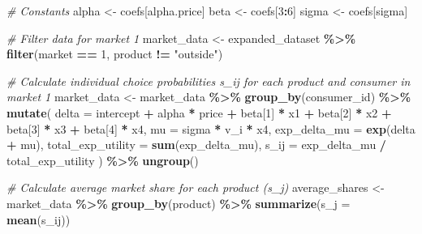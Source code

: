 \documentclass[
]{article}
\newenvironment{Shaded}{\begin{snugshade}}{\end{snugshade}}
\newcommand{\AttributeTok}[1]{\textcolor[rgb]{0.13,0.29,0.53}{#1}}
\newcommand{\CommentTok}[1]{\textcolor[rgb]{0.56,0.35,0.01}{\textit{#1}}}
\newcommand{\DecValTok}[1]{\textcolor[rgb]{0.00,0.00,0.81}{#1}}
\newcommand{\FunctionTok}[1]{\textcolor[rgb]{0.13,0.29,0.53}{\textbf{#1}}}
\newcommand{\NormalTok}[1]{#1}
\newcommand{\OtherTok}[1]{\textcolor[rgb]{0.56,0.35,0.01}{#1}}
\newcommand{\SpecialCharTok}[1]{\textcolor[rgb]{0.81,0.36,0.00}{\textbf{#1}}}
\newcommand{\StringTok}[1]{\textcolor[rgb]{0.31,0.60,0.02}{#1}}
\begin{document}
\begin{Shaded}
\begin{Highlighting}[]
\CommentTok{\# Constants}
\NormalTok{alpha }\OtherTok{\textless{}{-}}\NormalTok{ coefs[}\StringTok{\textquotesingle{}alpha.price\textquotesingle{}}\NormalTok{] }
\NormalTok{beta }\OtherTok{\textless{}{-}}\NormalTok{ coefs[}\DecValTok{3}\SpecialCharTok{:}\DecValTok{6}\NormalTok{]}
\NormalTok{sigma }\OtherTok{\textless{}{-}}\NormalTok{ coefs[}\StringTok{\textquotesingle{}sigma\textquotesingle{}}\NormalTok{]   }

\CommentTok{\# Filter data for market 1}
\NormalTok{market\_data }\OtherTok{\textless{}{-}}\NormalTok{ expanded\_dataset }\SpecialCharTok{\%\textgreater{}\%}
  \FunctionTok{filter}\NormalTok{(market }\SpecialCharTok{==} \DecValTok{1}\NormalTok{, product }\SpecialCharTok{!=} \StringTok{"outside"}\NormalTok{) }

\CommentTok{\# Calculate individual choice probabilities s\_ij for each product and consumer in market 1}
\NormalTok{market\_data }\OtherTok{\textless{}{-}}\NormalTok{ market\_data }\SpecialCharTok{\%\textgreater{}\%}
  \FunctionTok{group\_by}\NormalTok{(consumer\_id) }\SpecialCharTok{\%\textgreater{}\%}
  \FunctionTok{mutate}\NormalTok{(}
    \AttributeTok{delta =}\NormalTok{ intercept }\SpecialCharTok{+}\NormalTok{ alpha }\SpecialCharTok{*}\NormalTok{ price }\SpecialCharTok{+}\NormalTok{ beta[}\DecValTok{1}\NormalTok{] }\SpecialCharTok{*}\NormalTok{ x1 }\SpecialCharTok{+}\NormalTok{ beta[}\DecValTok{2}\NormalTok{] }\SpecialCharTok{*}\NormalTok{ x2 }\SpecialCharTok{+}\NormalTok{ beta[}\DecValTok{3}\NormalTok{] }\SpecialCharTok{*}\NormalTok{ x3 }\SpecialCharTok{+}\NormalTok{ beta[}\DecValTok{4}\NormalTok{] }\SpecialCharTok{*}\NormalTok{ x4,}
    \AttributeTok{mu =}\NormalTok{ sigma }\SpecialCharTok{*}\NormalTok{ v\_i }\SpecialCharTok{*}\NormalTok{ x4,}
    \AttributeTok{exp\_delta\_mu =} \FunctionTok{exp}\NormalTok{(delta }\SpecialCharTok{+}\NormalTok{ mu),}
    \AttributeTok{total\_exp\_utility =} \FunctionTok{sum}\NormalTok{(exp\_delta\_mu),}
    \AttributeTok{s\_ij =}\NormalTok{ exp\_delta\_mu }\SpecialCharTok{/}\NormalTok{ total\_exp\_utility}
\NormalTok{  ) }\SpecialCharTok{\%\textgreater{}\%}
  \FunctionTok{ungroup}\NormalTok{()}

\CommentTok{\# Calculate average market share for each product (s\_j)}
\NormalTok{average\_shares }\OtherTok{\textless{}{-}}\NormalTok{ market\_data }\SpecialCharTok{\%\textgreater{}\%}
  \FunctionTok{group\_by}\NormalTok{(product) }\SpecialCharTok{\%\textgreater{}\%}
  \FunctionTok{summarize}\NormalTok{(}\AttributeTok{s\_j =} \FunctionTok{mean}\NormalTok{(s\_ij))}


\end{Highlighting}
\end{Shaded}
\end{document}
